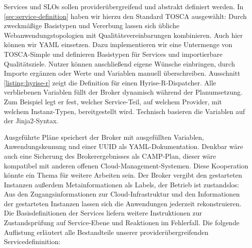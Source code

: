Services und SLOs sollen providerübergreifend und abstrakt definiert werden. In \autoref{sec:service-definition} haben wir hierzu den Standard TOSCA ausgewählt: Durch zweckmäßige Basistypen und Vererbung lassen sich übliche Webanwendungstopologien mit Qualitätsvereinbarungen kombinieren. Auch hier können wir YAML einsetzen. Dazu implementieren wir eine Untermenge von TOSCA-Simple und definieren Basistypen für Services und importierbare Qualitätsziele. Nutzer können anschließend eigene Wünsche einbringen, durch Importe ergänzen oder Werte und Variablen manuell überschreiben. Ausschnitt \autoref{listing:hyrise-r} zeigt die Definition für einen Hyrise-R-Dispatcher. Alle verbliebenen Variablen füllt der Broker dynamisch während der Planumsetzung. Zum Beispiel legt er fest, welcher Service-Teil, auf welchem Provider, mit welchem Instanz-Typen, bereitgestellt wird. Technisch basieren die Variablen auf der Jinja2-Syntax. 

Ausgeführte Pläne speichert der Broker mit ausgefüllten Variablen, Anwendungskennung und einer UUID als YAML-Dokumentation. Denkbar wäre auch eine Sicherung des Brokerergebnisses als CAMP-Plan, dieser wäre kompatibel mit anderen offenen Cloud-Management-Systemen. Diese Kooperation könnte ein Thema für weitere Arbeiten sein. Der Broker vergibt den gestarteten Instanzen außerdem Metainformationen als Labels, der Betrieb ist zustandslos: Aus den Zugangsinformationen zur Cloud-Infrastruktur und den Informationen der gestarteten Instanzen lassen sich die Anwendungen jederzeit rekonstruieren. Die Basisdefinitionen der Services liefern weitere Instruktionen zur Zustandsprüfung auf Service-Ebene und Reaktionen im Fehlerfall. Die folgende Auflistung erläutert alle Bestandteile unserer providerübergreifenden Servicedefininition:


